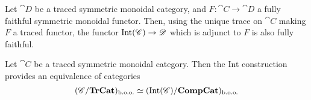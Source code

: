 \begin{lemma}
	Let $\cat{D}$ be a traced symmetric monoidal category, and $F\colon\cat{C}\to\cat{D}$ a fully faithful symmetric monoidal functor. Then, using the unique trace on $\cat{C}$ making $F$ a traced functor, the functor $\operatorname{Int}(\mathscr{C})\to\mathscr{D}$ which is adjunct to $F$ is also fully faithful.
\end{lemma}

\begin{proposition}
	Let $\cat{C}$ be a traced symmetric monoidal category. Then the Int construction provides an equivalence of categories
	\[
		(\mathscr{C}/\mathbf{TrCat})_{\text{b.o.o.}} \simeq (\operatorname{Int}(\mathscr{C})/\mathbf{CompCat})_{\text{b.o.o.}}
	\]
\end{proposition}